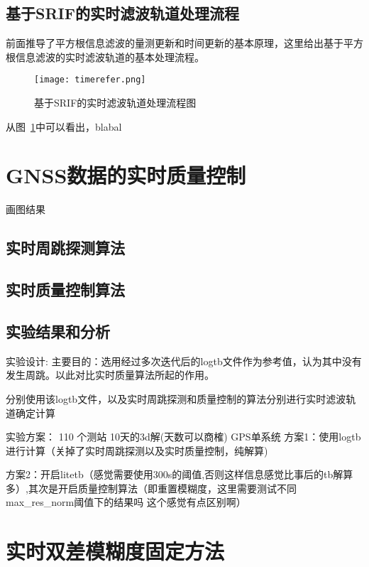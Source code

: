 \subsection{基于SRIF的实时滤波轨道处理流程}

前面推导了平方根信息滤波的量测更新和时间更新的基本原理，这里给出基于平方根信息滤波的实时滤波轨道的基本处理流程。

\begin{figure}
  \centering
  \texttt{[image: timerefer.png]}
  \caption{基于SRIF的实时滤波轨道处理流程图}
  \label{fig:SRIF_flowchart}
\end{figure}

从图~\ref{fig:SRIF_flowchart}中可以看出，blabal

\section{GNSS数据的实时质量控制}

画图结果

\subsection{实时周跳探测算法}

\subsection{实时质量控制算法}

\subsection{实验结果和分析}

实验设计:
主要目的：选用经过多次迭代后的log\underline{\space}tb文件作为参考值，认为其中没有发生周跳。以此对比实时质量算法所起的作用。

分别使用该log\underline{\space}tb文件，以及实时周跳探测和质量控制的算法分别进行实时滤波轨道确定计算

实验方案： 110 个测站 10天的3d解(天数可以商榷) GPS单系统
方案1：使用log\underline{\space}tb进行计算（关掉了实时周跳探测以及实时质量控制，纯解算)

方案2：开启litetb（感觉需要使用300s的阈值,否则这样信息感觉比事后的tb解算多）,其次是开启质量控制算法（即重置模糊度，这里需要测试不同max\_res\_norm阈值下的结果吗 这个感觉有点区别啊）

\section{实时双差模糊度固定方法}

